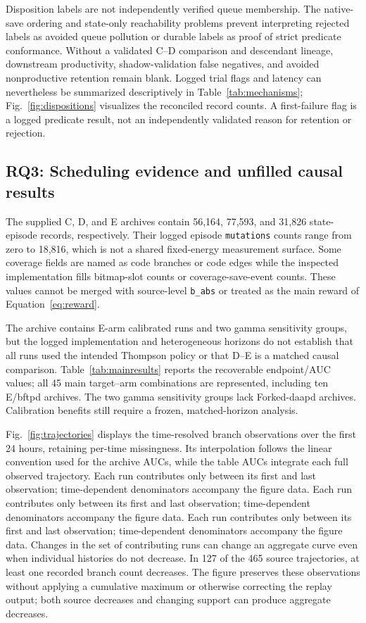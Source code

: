 \documentclass[final,5p,times,number]{elsarticle}
\newcommand{\figref}[1]{Fig.~\ref{#1}}
\begin{document}
Disposition labels are not independently verified queue membership. The native-save ordering and state-only reachability problems prevent interpreting rejected labels as avoided queue pollution or durable labels as proof of strict predicate conformance. Without a validated C--D comparison and descendant lineage, downstream productivity, shadow-validation false negatives, and avoided nonproductive retention remain blank. Logged trial flags and latency can nevertheless be summarized descriptively in Table~\ref{tab:mechanisms}; \figref{fig:dispositions} visualizes the reconciled record counts. A first-failure flag is a logged predicate result, not an independently validated reason for retention or rejection.

\subsection{RQ3: Scheduling evidence and unfilled causal results}
The supplied C, D, and E archives contain 56,164, 77,593, and 31,826 state-episode records, respectively. Their logged episode \texttt{mutations} counts range from zero to 18,816, which is not a shared fixed-energy measurement surface. Some coverage fields are named as code branches or code edges while the inspected implementation fills bitmap-slot counts or coverage-save-event counts. These values cannot be merged with source-level \texttt{b\_abs} or treated as the main reward of Equation~\ref{eq:reward}.

The archive contains E-arm calibrated runs and two gamma sensitivity groups, but the logged implementation and heterogeneous horizons do not establish that all runs used the intended Thompson policy or that D--E is a matched causal comparison. Table~\ref{tab:mainresults} reports the recoverable endpoint/AUC values; all 45 main target--arm combinations are represented, including ten E/bftpd archives. The two gamma sensitivity groups lack Forked-daapd archives. Calibration benefits still require a frozen, matched-horizon analysis.

\figref{fig:trajectories} displays the time-resolved branch observations over the first 24 hours, retaining per-time missingness. Its interpolation follows the linear convention used for the archive AUCs, while the table AUCs integrate each full observed trajectory. Each run contributes only between its first and last observation; time-dependent denominators accompany the figure data. Each run contributes only between its first and last observation; time-dependent denominators accompany the figure data. Each run contributes only between its first and last observation; time-dependent denominators accompany the figure data. Changes in the set of contributing runs can change an aggregate curve even when individual histories do not decrease. In 127 of the 465 source trajectories, at least one recorded branch count decreases. The figure preserves these observations without applying a cumulative maximum or otherwise correcting the replay output; both source decreases and changing support can produce aggregate decreases.
\end{document}

